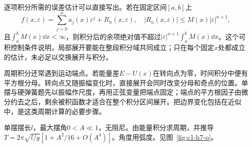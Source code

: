 逐项积分所需的误差估计可以直接写出。若在固定区间$[a,b]$上
\[f(x,\varepsilon)=\sum_{j=0}^n a_j(x)\varepsilon^j+R_n(x,\varepsilon),\quad
|R_n(x,\varepsilon)|\le M(x)|\varepsilon|^{n+1},\]
且$\int_a^bM(x)\dd x<\infty$，则积分后的余项绝对值不超过$|\varepsilon|^{n+1}\int_a^bM(x)\dd x$。这个可积控制条件说明，局部展开要能在整段积分域共同成立；只在每个固定$x$处都成立的估计，未必足以交换展开与积分。

周期积分还常遇到运动端点。若能量差$E-U(x)$在转向点为零，时间积分中便有平方根分母。转向点又随振幅变化时，直接展开会同时改变分母和奇点的位置。单摆与硬弹簧题先以振幅作尺度，再用正弦变量把端点固定；端点的平方根因子由微分约去之后，剩余被积函数才适合在整个积分区间展开。把边界变化包括在近似中，是这类周期计算的必要步骤。

\begin{example}[单摆周期的振幅修正]\label{ex:c1-h7}
单摆摆长$l$，最大摆角$0<A\ll1$，无阻尼。由能量积分求周期，并推导$T=2\pi\sqrt{l/g}[1+A^2/16+O(A^4)]$。角度用弧度。见图~\ref{fig:c1-h7-q}。
\end{example}

